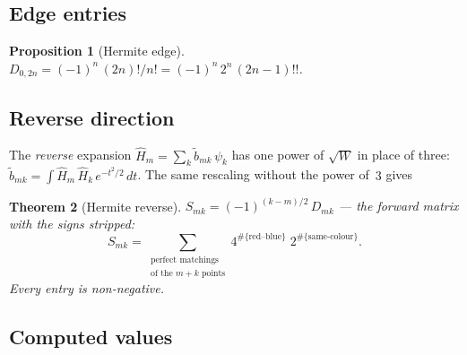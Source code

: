 \documentclass[11pt,a4paper]{article}
\theoremstyle{plain}
\newtheorem{theorem}{Theorem}[section]
\newtheorem{proposition}[theorem]{Proposition}
\theoremstyle{definition}
\begin{document}
\subsection{Edge entries}

\begin{tcolorbox}[colback=black!5, colframe=black!5, boxrule=0pt,
  sharp corners]
\begin{proposition}[Hermite edge]\label{prop:hermite-edge}
$D_{0,2n} = (-1)^n\, (2n)!/n! = (-1)^n\, 2^n\, (2n{-}1)!!$.
\end{proposition}
\end{tcolorbox}

\subsection{Reverse direction}

The \emph{reverse} expansion $\widehat H_m = \sum_k \widetilde
b_{mk}\, \psi_k$ has one power of $\sqrt{W}$ in place of three:
$\widetilde b_{mk} = \int \widehat H_m\, \widehat H_k\,
e^{-t^2/2}\, dt$. The same rescaling without the power of~$3$ gives

\begin{tcolorbox}[colback=black!5, colframe=black!5, boxrule=0pt,
  sharp corners]
\begin{theorem}[Hermite reverse]\label{thm:hermite-rev}
$S_{mk} = (-1)^{(k-m)/2}\, D_{mk}$ --- the forward matrix with the
signs stripped:
\[
  S_{mk} = \sum_{\substack{\text{perfect matchings}\\
  \text{of the } m+k \text{ points}}}
  4^{\#\{\text{red--blue}\}} \; 2^{\#\{\text{same-colour}\}}.
\]
Every entry is non-negative.
\end{theorem}
\end{tcolorbox}

\subsection{Computed values}
\end{document}

